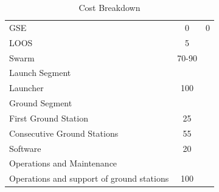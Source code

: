 \begin{table}[htbp]
\begin{tabular}{p{10cm} | c | c }
       \hspace{2.5cm}GSE &         0 &          0\\

      \hspace{2.5cm}LOOS &         5 &          \\ \hline

     \hspace{2.0cm}Swarm &         70-90 &          \\ \hline

Launch Segment &         &          \\ \hline

  \hspace{1.0cm}Launcher &         100 &          \\ \hline

Ground Segment &          &          \\ \hline

\hspace{1.0cm}First Ground Station &         25 &          \\

\hspace{1.0cm}Consecutive Ground Stations &         55 &          \\

\hspace{1.0cm}Software &         20 &          \\ \hline

Operations and Maintenance &          &          \\ \hline

\hspace{1.0cm}Operations and support of ground stations &         100 &          \\
	
\end{tabular} 
\caption{Cost Breakdown}
	\label{tab:CostBreakdown} 
\end{table}



